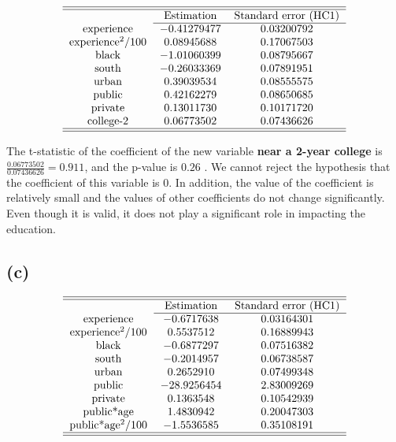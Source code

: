 \documentclass{article}
\begin{document}
\begin{equation*}
\begin{tabular}{ccc}
\hline\hline
& Estimation & Standard error (HC1) \\ \cline{2-3}
experience & $-0.41279477$ & $0.03200792$ \\ 
experience$^{2}/100$ & $0.08945688$ & $0.17067503$ \\ 
black & $-1.01060399$ & $0.08795667$ \\ 
south & $-0.26033369$ & $0.07891951$ \\ 
urban & $0.39039534$ & $0.08555575$ \\ 
public & $0.42162279$ & $0.08650685$ \\ 
private & $0.13011730$ & $0.10171720$ \\ 
college-2 & $0.06773502$ & $0.07436626$ \\ \hline\hline
\end{tabular}%
\end{equation*}

The t-statistic of the coefficient of the new variable \textbf{near a 2-year
college }is $\frac{0.06773502}{0.07436626}=0.911$, and the p-value is $0.26$%
. We cannot reject the hypothesis that the coefficient of this variable is $%
0 $. In addition, the value of the coefficient is relatively small and the
values of other coefficients do not change significantly. Even though it is
valid, it does not play a significant role in impacting the education.

\subsection*{(c)}

\begin{equation*}
\begin{tabular}{ccc}
\hline\hline
& Estimation & Standard error (HC1) \\ \cline{2-3}
experience & $-0.6717638$ & $0.03164301$ \\ 
experience$^{2}/100$ & $0.5537512$ & $0.16889943$ \\ 
black & $-0.6877297$ & $0.07516382$ \\ 
south & $-0.2014957$ & $0.06738587$ \\ 
urban & $0.2652910$ & $0.07499348$ \\ 
public & $-28.9256454$ & $2.83009269$ \\ 
private & $0.1363548$ & $0.10542939$ \\ 
public*age & $1.4830942$ & $0.20047303$ \\ 
public*age$^{2}/100$ & $-1.5536585$ & $0.35108191$ \\ \hline\hline
\end{tabular}%
\end{equation*}
\end{document}
